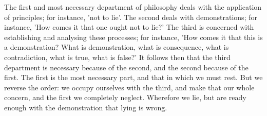 The  first  and  most  necessary   department  of  philosophy  deals  with  the
application of  principles; for instance, 'not  to lie'. The second  deals with
demonstrations; for  instance, 'How comes  it that one  ought not to  lie?' The
third  is  concerned  with  establishing and  analysing  these  processes;  for
instance, 'How  comes it that this  is a demonstration? What  is demonstration,
what is  consequence, what is contradiction,  what is true, what  is false?' It
follows then that the third department  is necessary because of the second, and
the second because of the first. The first is the most necessary part, and that
in which we must  rest. But we reverse the order: we  occupy ourselves with the
third, and  make that our whole  concern, and the first  we completely neglect.
Wherefore we  lie, but are  ready enough with  the demonstration that  lying is
wrong.
